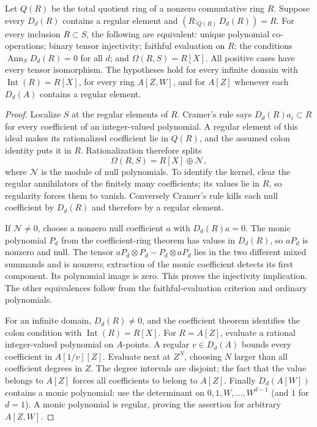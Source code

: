 \begin{theorem}\label{thm:regular-vandermonde-criterion}
Let $Q(R)$ be the total quotient ring of a nonzero commutative ring
$R$. Suppose every $D_d(R)$ contains a regular element and
$(R:_{Q(R)}D_d(R))=R$. For every inclusion $R\subset S$, the
following are equivalent: unique polynomial co-operations; binary
tensor injectivity; faithful evaluation on $R$; the conditions
$\operatorname{Ann}_S D_d(R)=0$ for all $d$; and
$\Omega(R,S)=R[X]$. All positive cases have every tensor
isomorphism. The hypotheses hold for every infinite domain with
$\operatorname{Int}(R)=R[X]$, for every ring $A[Z,W]$, and for
$A[Z]$ whenever each $D_d(A)$ contains a regular element.
\end{theorem}
\begin{proof}
Localize $S$ at the regular elements of $R$. Cramer's rule says
$D_d(R)a_i\subset R$ for every coefficient of an integer-valued
polynomial. A regular element of this ideal makes its rationalized
coefficient lie in $Q(R)$, and the assumed colon identity puts it
in $R$. Rationalization therefore splits
\[
              \Omega(R,S)=R[X]\oplus\mathcal N,
\]
where $\mathcal N$ is the module of null polynomials. To identify
the kernel, clear the regular annihilators of the finitely many
coefficients; its values lie in $R$, so regularity forces them
to vanish. Conversely Cramer's rule kills each null coefficient
by $D_d(R)$ and therefore by a regular element.

If $\mathcal N\ne0$, choose a nonzero null coefficient $a$ with
$D_d(R)a=0$. The monic polynomial $P_d$ from the coefficient-ring
theorem has values in $D_d(R)$, so $aP_d$ is nonzero and null.
The tensor $aP_d\otimes P_d-P_d\otimes aP_d$ lies in the two
different mixed summands and is nonzero; extraction of the monic
coefficient detects its first component. Its polynomial image is
zero. This proves the injectivity implication. The other
equivalences follow from the faithful-evaluation criterion and
ordinary polynomials.

For an infinite domain, $D_d(R)\ne0$, and the coefficient theorem
identifies the colon condition with $\operatorname{Int}(R)=R[X]$.
For $R=A[Z]$, evaluate a rational integer-valued polynomial on
$A$-points. A regular $v\in D_d(A)$ bounds every coefficient in
$A[1/v][Z]$. Evaluate next at $Z^N$, choosing $N$ larger than all
coefficient degrees in $Z$. The degree intervals are disjoint;
the fact that the value belongs to $A[Z]$ forces all coefficients
to belong to $A[Z]$. Finally $D_d(A[W])$ contains a monic
polynomial: use the determinant on $0,1,W,\ldots,W^{d-1}$
(and $1$ for $d=1$). A monic polynomial is regular, proving
the assertion for arbitrary $A[Z,W]$.
\end{proof}

